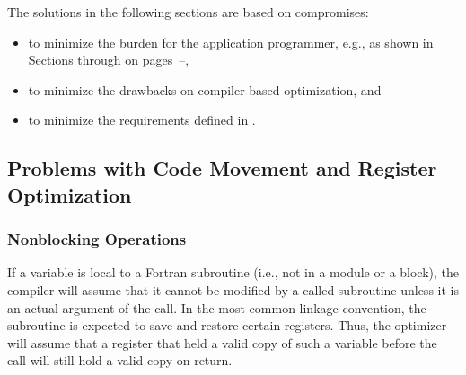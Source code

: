 The solutions in the following sections are based on compromises:
\begin{itemize}
\item to minimize the burden for the application programmer,
      e.g., as shown in
      Sections 
      through 
      on pages~\pageref{sec:f90-problems:code-movements:solutions}--\pageref{sec:f90-problems:volatile},
\item to minimize the drawbacks on compiler based optimization, and
\item to minimize the requirements defined in
      .
\end{itemize}

\subsection{Problems with Code Movement and Register Optimization}
\label{sec:f90-problems:code-movements}

\subsubsection{Nonblocking Operations}

If a variable is local to a Fortran subroutine (i.e., not in
a module or a  block), the compiler will assume that it cannot be modified
by a called subroutine unless it is an actual argument of the
call.  In the most common linkage convention, the subroutine is
expected to save and restore certain registers. Thus, the optimizer
will assume that a register that held a valid copy of such a
variable before the call will still hold a valid copy on return.

